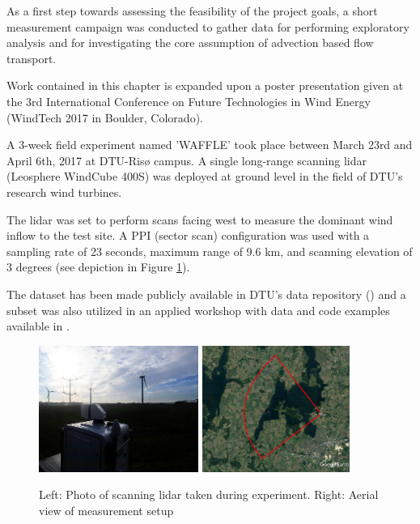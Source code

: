 
As a first step towards assessing the feasibility of the project goals, a short measurement campaign was conducted to gather data for performing exploratory analysis and for investigating the core assumption of advection based flow transport.

Work contained in this chapter is expanded upon a poster presentation given at the 3rd International Conference on Future Technologies in Wind Energy (WindTech 2017 in Boulder, Colorado).

A 3-week field experiment named 'WAFFLE' took place between March 23rd and April 6th, 2017 at DTU-Ris{\o} campus. A single long-range scanning lidar (Leosphere WindCube 400S) was deployed at ground level in the field of DTU's research wind turbines. 

The lidar was set to perform scans facing west to measure the dominant wind inflow to the test site. A PPI (sector scan) configuration was used with a sampling rate of 23 seconds, maximum range of 9.6 km, and scanning elevation of 3 degrees (see depiction in Figure \ref{fig:waffle_experiment_setup}).

The dataset has been made publicly available in DTU's data repository (\cite{waffle_dataset}) and a subset was also utilized in an applied workshop with data and code examples available in \cite{simon_eawe_workshop}.

\begin{figure}[htbp]
    \centering
        \includegraphics[width=0.465\textwidth]{graphics/results/waffle/waffle_field_photo.png}        \includegraphics[width=0.43\textwidth]{graphics/results/waffle/experiment_overview_crop.png}
    \caption{Left: Photo of scanning lidar taken during experiment. Right: Aerial view of measurement setup}
    \label{fig:waffle_experiment_setup}
\end{figure}

